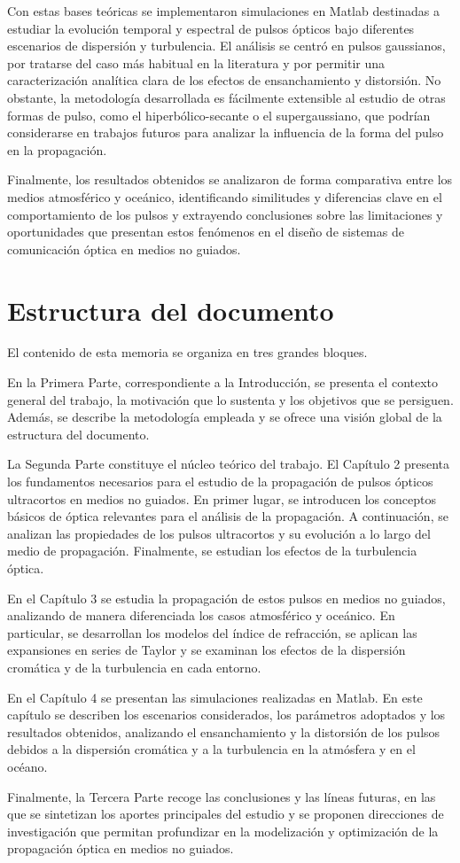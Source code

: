 Con estas bases teóricas se implementaron simulaciones en Matlab destinadas a estudiar la evolución temporal y espectral de pulsos ópticos bajo diferentes escenarios de dispersión y turbulencia. El análisis se centró en pulsos gaussianos, por tratarse del caso más habitual en la literatura y por permitir una caracterización analítica clara de los efectos de ensanchamiento y distorsión. No obstante, la metodología desarrollada es fácilmente extensible al estudio de otras formas de pulso, como el hiperbólico-secante o el supergaussiano, que podrían considerarse en trabajos futuros para analizar la influencia de la forma del pulso en la propagación.

Finalmente, los resultados obtenidos se analizaron de forma comparativa entre los medios atmosférico y oceánico, identificando similitudes y diferencias clave en el comportamiento de los pulsos y extrayendo conclusiones sobre las limitaciones y oportunidades que presentan estos fenómenos en el diseño de sistemas de comunicación óptica en medios no guiados.

\section{Estructura del documento}
El contenido de esta memoria se organiza en tres grandes bloques.

En la Primera Parte, correspondiente a la Introducción, se presenta el contexto general del trabajo, la motivación que lo sustenta y los objetivos que se persiguen. Además, se describe la metodología empleada y se ofrece una visión global de la estructura del documento.

La Segunda Parte constituye el núcleo teórico del trabajo. El Capítulo 2 presenta los fundamentos necesarios para el estudio de la propagación de pulsos ópticos ultracortos en medios no guiados. En primer lugar, se introducen los conceptos básicos de óptica relevantes para el análisis de la propagación. A continuación, se analizan las propiedades de los pulsos ultracortos y su evolución a lo largo del medio de propagación. Finalmente, se estudian los efectos de la turbulencia óptica.

En el Capítulo 3 se estudia la propagación de estos pulsos en medios no guiados, analizando de manera diferenciada los casos atmosférico y oceánico. En particular, se desarrollan los modelos del índice de refracción, se aplican las expansiones en series de Taylor y se examinan los efectos de la dispersión cromática y de la turbulencia en cada entorno.

En el Capítulo 4 se presentan las simulaciones realizadas en Matlab. En este capítulo se describen los escenarios considerados, los parámetros adoptados y los resultados obtenidos, analizando el ensanchamiento y la distorsión de los pulsos debidos a la dispersión cromática y a la turbulencia en la atmósfera y en el océano.

Finalmente, la Tercera Parte recoge las conclusiones y las líneas futuras, en las que se sintetizan los aportes principales del estudio y se proponen direcciones de investigación que permitan profundizar en la modelización y optimización de la propagación óptica en medios no guiados.

\chapterend
